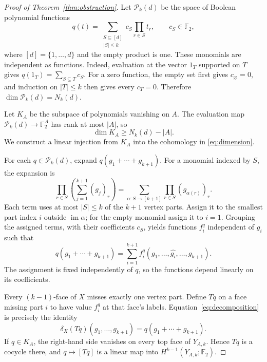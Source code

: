 \documentclass[11pt]{article}
\newcommand{\F}{\mathbb F_2}
\newcommand{\im}{\operatorname{im}}
\begin{document}
\begin{proof}[Proof of Theorem~\ref{thm:obstruction}]
Let $\mathcal P_k(d)$ be the space of Boolean polynomial functions
\[
q(t)=\sum_{\substack{S\subseteq[d]\\|S|\le k}}c_S\prod_{r\in S}t_r,
\qquad c_S\in\F,
\]
where $[d]=\{1,\ldots,d\}$ and the empty product is one.
These monomials are independent as functions. Indeed, evaluation at the
vector $1_T$ supported on $T$ gives $q(1_T)=\sum_{S\subseteq T}c_S$.
For a zero function, the empty set first gives $c_\varnothing=0$, and
induction on $|T|\le k$ then gives every $c_T=0$.
Therefore $\dim\mathcal P_k(d)=N_k(d)$.

Let $K_A$ be the subspace of polynomials vanishing on $A$.
The evaluation map $\mathcal P_k(d)\to\F^A$ has rank at most $|A|$, so
\begin{equation}\label{eq:kernel}
\dim K_A\ge N_k(d)-|A|.
\end{equation}
We construct a linear injection from $K_A$ into the cohomology in
\eqref{eq:dimension}.

For each $q\in\mathcal P_k(d)$, expand $q(g_1+\cdots+g_{k+1})$.
For a monomial indexed by $S$, the expansion is
\begin{equation}\label{eq:monomial}
\prod_{r\in S}\left(\sum_{j=1}^{k+1}(g_j)_r\right)
=\sum_{\alpha:S\to[k+1]}\prod_{r\in S}(g_{\alpha(r)})_r.
\end{equation}
Each term uses at most $|S|\le k$ of the $k+1$ vertex parts.
Assign it to the smallest part index $i$ outside $\im\alpha$;
for the empty monomial assign it to $i=1$.
Grouping the assigned terms, with their coefficients $c_S$, yields functions
$f_i^q$ independent of $g_i$ such that
\begin{equation}\label{eq:decomposition}
q(g_1+\cdots+g_{k+1})
=\sum_{i=1}^{k+1}f_i^q(g_1,\ldots,\widehat{g_i},\ldots,g_{k+1}).
\end{equation}
The assignment is fixed independently of $q$, so the functions depend
linearly on its coefficients.

Every $(k-1)$-face of $X$ misses exactly one vertex part. Define $Tq$ on
a face missing part $i$ to have value $f_i^q$ at that face's labels.
Equation~\eqref{eq:decomposition} is precisely the identity
\begin{equation}\label{eq:coboundary}
\delta_X(Tq)(g_1,\ldots,g_{k+1})=q(g_1+\cdots+g_{k+1}).
\end{equation}
If $q\in K_A$, the right-hand side vanishes on every top face of
$Y_{A,k}$. Hence $Tq$ is a cocycle there, and $q\mapsto[Tq]$ is a linear
map into $H^{k-1}(Y_{A,k};\F)$.


\end{proof}
\end{document}
